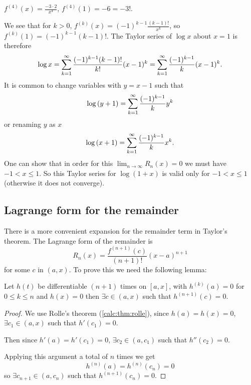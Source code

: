 \documentclass[10pt, a4paper]{article}
\begin{document}
$f ^ {(4)}(x) = \frac{-3 \cdot 2}{x ^ 4}$,
$f ^ {(4)}(1) = -6 = -3!$.

We see that for $k > 0$,
$f ^ {(k)}(x) = (-1) ^ {k - 1}\frac{(k - 1)!}{x ^ k}$,
so $f ^ {(k)}(1) = (-1) ^ {k - 1}(k - 1)!$.
The Taylor series of $\log{x}$ about $x = 1$ is therefore
\[
\log{x} = \infsum[k = 1]\frac{(-1) ^ {k - 1}(k - 1)!}{k!}(x - 1) ^ k = \infsum[k = 1]\frac{(-1) ^ {k - 1}}{k}(x - 1) ^ k.
\]
It is common to change variables with $y = x - 1$ such that
\[
\log{(y + 1)} = \infsum[k = 1]\frac{(-1) ^ {k - 1}}{k}y ^ k
\]
or renaming $y$ as $x$
\[
\log{(x + 1)} = \infsum[k = 1]\frac{(-1) ^ {k - 1}}{k}x ^ k.
\]
One can show that in order for this $\lim_{n \rightarrow \infty}R_n(x) = 0$ we must have $-1 < x \leq 1$.
So this Taylor series for $\log(1 + x)$ is valid only for $-1 < x \leq 1$
(otherwise it does not converge).

\subsection{Lagrange form for the remainder}
There is a more convenient expansion for the remainder term in Taylor's theorem.
The Lagrange form of the remainder is
\[
R_n(x) = \frac{f ^ {(n + 1)}(c)}{(n + 1)!}(x - a) ^ {n + 1}
\]
for some $c$ in $(a, x)$.
To prove this we need the following lemma:
\begin{lemma}
    Let $h(t)$ be differentiable $(n + 1)$ times on $[a, x]$,
    with $h ^ {(k)}(a) = 0$ for $0 \leq k \leq n$ and $h(x) = 0$ then $\exists c \in (a, x)$ such that $h ^ {(n + 1)}(c) = 0$.
    \begin{proof}
        We use Rolle's theorem
        (\autoref{calc:thm:rolle}),
        since $h(a) = h(x) = 0$,
        $\exists c_1 \in (a, x)$ such that $h'(c_1) = 0$.

        Then since $h'(a) = h'(c_1) = 0$,
        $\exists c_2 \in (a, c_1)$ such that $h''(c_2) = 0$.

        Applying this argument a total of $n$ times we get
        \[
        h ^ {(n)}(a) = h ^ {(n)}(c_n) = 0
        \]
        so $\exists c_{n + 1} \in (a, c_n)$ such that $h ^ {(n + 1)}(c_n) = 0$.
    \end{proof}
\end{lemma}
\end{document}

